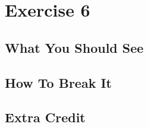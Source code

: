 \chapter{Exercise 6}


\section{What You Should See}


\section{How To Break It}


\section{Extra Credit}



